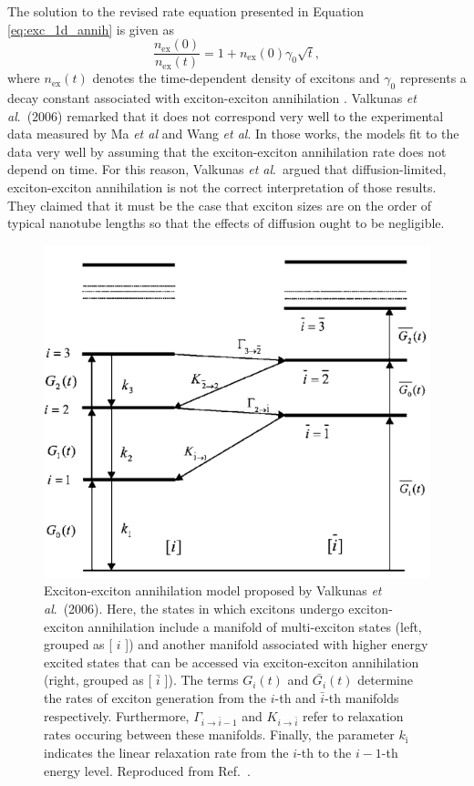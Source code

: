 The solution to the revised rate equation presented in Equation \eqref{eq:exc_1d_annih} is given as
\begin{equation}
	\frac{n_\text{ex}(0)}{n_\text{ex}(t)} = 1 + n_\text{ex}(0) \gamma_0 \sqrt{t},
\end{equation}
where $n_\text{ex}(t)$ denotes the time-dependent density of excitons and $\gamma_0$ represents a decay constant associated with exciton-exciton annihilation \cite{valkunas2006exciton}. Valkunas \textit{et al}.\ (2006) remarked that it does not correspond very well to the experimental data measured by Ma \textit{et al} and Wang \textit{et al}. In those works, the models fit to the data very well by assuming that the exciton-exciton annihilation rate does not depend on time. For this reason, Valkunas \textit{et al}.\ argued that diffusion-limited, exciton-exciton annihilation is not the correct interpretation of those results. They claimed that it must be the case that exciton sizes are on the order of typical nanotube lengths so that the effects of diffusion ought to be negligible.

\begin{figure}[H]
	\centering
	\includegraphics[scale=0.5]{images/chapter_prior_works/exciton_manifold_valkunas_2006}
	\caption{Exciton-exciton annihilation model proposed by Valkunas \textit{et al}.\ (2006). Here, the states in which excitons undergo exciton-exciton annihilation include a manifold of multi-exciton states (left, grouped as [ $i$ ]) and another manifold associated with higher energy excited states that can be accessed via exciton-exciton annihilation (right, grouped as [ $\bar{i}$ ]). The terms $G_{i}(t)$ and $\bar{G_{i}}(t)$ determine the rates of exciton generation from the $i$-th and $\bar{i}$-th manifolds respectively. Furthermore, $\Gamma_{i \rightarrow \bar{i}-1}$ and $K_{i \rightarrow \bar{i}}$ refer to relaxation rates occuring between these manifolds. Finally, the parameter $k_\text{i}$ indicates the linear relaxation rate from the $i$-th to the $i-1$-th energy level. Reproduced from Ref.\ \cite{valkunas2006exciton}. }
	\label{fig:exciton_manif_valkunas}
\end{figure}

